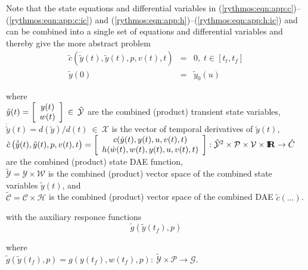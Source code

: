 \documentclass[pdf,ps2pdf,11pt]{SANDreport}
\begin{document}
Note that the state equations and differential variables in
(\ref{rythmos:eqn:app:c})--(\ref{rythmos:eqn:app:c:ic}) and
(\ref{rythmos:eqn:app:h})--(\ref{rythmos:eqn:app:h:ic}) and can be combined
into a single set of equations and differential variables and thereby give
the more abstract problem
%
\begin{eqnarray}
\tilde{c}\left( \dot{\tilde{y}}(t), \tilde{y}(t), p, v(t), t \right) & = & 0,
\; t \in \left[ t_t, t_f \right] \label{rythmos:eqn:app:c_tilde} \\
\tilde{y}(0) & = & \tilde{y}_0(u) \label{rythmos:eqn:app:c_tilde:ic}
\end{eqnarray}
\begin{tabbing}
\hspace{4ex}where\hspace{1ex}\= \\
\>	$\tilde{y}(t) = {\bmat{c} y(t) \\ w(t) \emat} \:\in\:\tilde{\mathcal{Y}}$ are the combined (product) transient state variables, \\
\>	$\dot{\tilde{y}}(t) = d(\tilde{y})/d(t)\:\in\:\mathcal{X}$ is the vector of temporal derivatives of $\tilde{y}(t)$, \\
\>	$\tilde{c}\left( \dot{\tilde{y}}(t), \tilde{y}(t), p, v(t), t \right) =
		{\bmat{c} c(\dot{y}(t),y(t),u,v(t),t) \\ h(\dot{w}(t),w(t),y(t),u,v(t),t) \emat}
		: \tilde{\mathcal{Y}}^2 \times \mathcal{P} \times \mathcal{V} \times \RE \rightarrow \tilde{C}$ \\
\>	\hspace{4ex} are the combined (product) state DAE function, \\
\>	$\tilde{\mathcal{Y}} = \mathcal{Y} \times \mathcal{W}$ is the combined (product) vector space of the combined state variables $\tilde{y}(t)$, and \\
\>	$\tilde{\mathcal{C}} = \mathcal{C} \times \mathcal{H}$ is the combined (product) vector space of the combined DAE $\tilde{c}(\ldots)$.
\end{tabbing}
%
with the auxiliary responce functions
%
%
\begin{equation}
\tilde{g}(\tilde{y}(t_f),p)
\label{rythmos:eqn:app:g_tilde}
\end{equation}
\begin{tabbing}
\hspace{4ex}where\hspace{1ex}\= \\
\>	$\tilde{g}(\tilde{y}(t_f),p) = g(y(t_f),w(t_f),p) : \:
		\tilde{\mathcal{Y}} \times \mathcal{P}
		\rightarrow \mathcal{G}$.
\end{tabbing}
\end{document}

